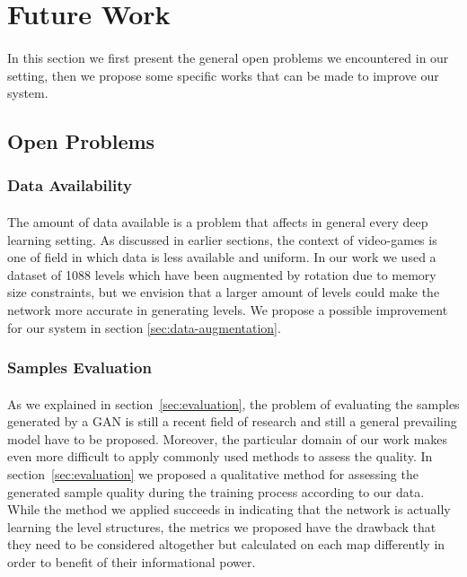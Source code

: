\section{Future Work}
\paragraph{} In this section we first present the general open problems we encountered in our setting, then we propose some specific works that can be made to improve our system.
\subsection{Open Problems}
\subsubsection{Data Availability}
\paragraph{} The amount of data available is a problem that affects in general every deep learning setting. As discussed in earlier sections, the context of video-games is one of field in which data is less available and uniform. In our work we used a dataset of 1088 levels which have been augmented by rotation due to memory size constraints, but we envision that a larger amount of levels could make the network more accurate in generating levels. We propose a possible improvement for our system in section \ref{sec:data-augmentation}.
\subsubsection{Samples Evaluation}
\paragraph{} As we explained in section~\ref{sec:evaluation}, the problem of evaluating the samples generated by a GAN is still a recent field of research and still a general prevailing model have to be proposed. Moreover, the particular domain of our work makes even more difficult to apply commonly used methods to assess the quality. In section~\ref{sec:evaluation} we proposed a qualitative method for assessing the generated sample quality during the training process according to our data. While the method we applied succeeds in indicating that the network is actually learning the level structures, the metrics we proposed have the drawback that they need to be considered altogether but calculated on each map differently in order to benefit of their informational power.

